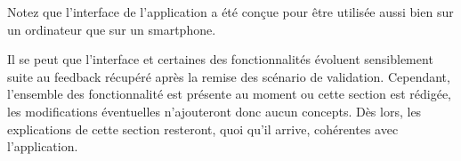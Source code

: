 Notez que l'interface de l'application a été conçue pour être utilisée aussi bien sur un ordinateur que sur un smartphone. 

Il se peut que l'interface et certaines des fonctionnalités évoluent sensiblement suite au feedback récupéré après la remise des scénario de validation. Cependant, l'ensemble des fonctionnalité est présente au moment ou cette section est rédigée, les modifications éventuelles n'ajouteront donc aucun concepts. Dès lors, les explications de cette section resteront, quoi qu'il arrive,  cohérentes avec l'application.







